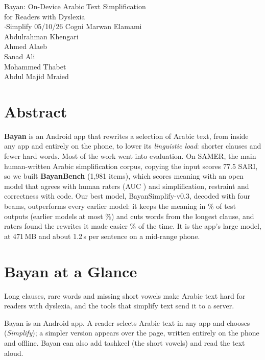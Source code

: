 \documentclass[10pt,a4paper]{article}
\newcommand{\vThree}{BayanSimplify-v0.3}
\begin{document}
\siccover
  {Bayan: On-Device Arabic Text Simplification\\for Readers with Dyslexia\\[1mm]
   {\normalfont\fontsize{12}{15}\selectfont {}\enspace$\cdot$\enspace Simplify}}
  {05/10/26}
  {Cogni}
  {Marwan Elamami\\ Abdulrahman Khengari\\ Ahmed Alaeb\\ Sanad Ali\\
   Mohammed Thabet\\ Abdul Majid Mraied}

\siccontents

\section*{Abstract}
{\small
\textbf{Bayan} is an Android app that rewrites a selection of Arabic text, from
inside any app and entirely on the phone, to lower its \emph{linguistic load}:
shorter clauses and fewer hard words. Most of the work went into evaluation. On
SAMER, the main human-written Arabic simplification corpus, copying the input
scores 77.5 SARI, so we built \textbf{BayanBench} (1,981 items), which scores
meaning with an open model that agrees with human raters (AUC \hAucSame{}) and
simplification, restraint and correctness with code. Our best model, \vThree{},
decoded with four beams, outperforms every earlier model: it keeps the meaning in
\mBeamTKept\% of test outputs (earlier models at most \bvHmaxKept\%) and cuts
\mBeamTClause{} words from the longest clause, and raters found the rewrites it made
easier \hmThreeChEasier\% of the time. It is the app's large model, at 471\,MB and
about 1.2\,s per sentence on a mid-range phone.\par}

\vspace{2mm}
\section*{Bayan at a Glance}
\label{sec:glance}

 Long clauses, rare words and missing short vowels make Arabic
text hard for readers with dyslexia, and the tools that simplify text send it to a
server.

 Bayan is an Android app. A reader selects Arabic text in any
app and chooses  (\emph{Simplify}); a simpler version appears over the page,
written entirely on the phone and offline. Bayan can also add tashkeel (the short
vowels) and read the text aloud.
\end{document}

